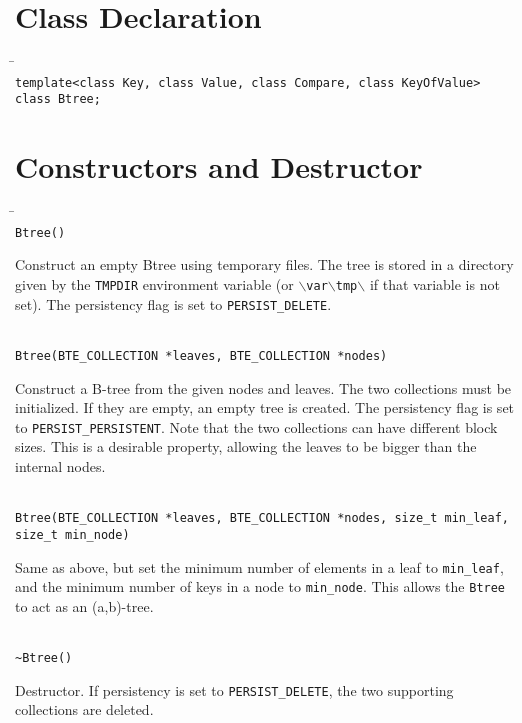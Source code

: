 \documentclass[11pt]{article}
\begin{document}
\section{Class Declaration}

   \begin{tabbing}
   \hspace*{.3in} \= \hspace{.5in} \= \\

   \> {\tt template<class Key, class Value, class Compare, class KeyOfValue> class Btree;}
   \end{tabbing}

\section{Constructors and Destructor}

   \begin{tabbing}
   \hspace*{.3in} \= \hspace{.5in} \= \\

   \> {\tt Btree()}\\ 
   \>\>\parbox[t]{5.5in}{Construct an empty Btree using temporary files. 
	The tree is stored in a directory given by the {\tt TMPDIR} 
	environment variable (or 
	{\tt $\backslash$var$\backslash$tmp$\backslash$} if that
	 variable is not set). The persistency flag is set to 
	{\tt PERSIST\_DELETE}.}\\[3mm]

   \> {\tt Btree(BTE\_COLLECTION *leaves, BTE\_COLLECTION *nodes)}\\ 
   \>\>\parbox[t]{5.5in}{Construct a B-tree from the given nodes and leaves.
	The two collections must be initialized. If they are empty, an
	empty tree is created. The persistency flag is set to 
	{\tt PERSIST\_PERSISTENT}. Note that the two collections can
	have different block sizes. This is a desirable property, 
	allowing the leaves to be bigger than the internal nodes.}\\[3mm]

   \> {\tt Btree(BTE\_COLLECTION *leaves, BTE\_COLLECTION *nodes, size\_t min\_leaf, size\_t min\_node)}\\ 
   \>\>\parbox[t]{5.5in}{Same as above, but set the minimum number of elements in a leaf to {\tt min\_leaf}, and the minimum number of keys in a node to {\tt min\_node}. This allows the {\tt Btree} to act as an (a,b)-tree. }\\[3mm]

   \> {\tt \verb|~|Btree()}\\ 
   \>\>\parbox[t]{5.5in}{Destructor. If persistency is set to 
	{\tt PERSIST\_DELETE}, the two supporting collections are deleted.}

   \end{tabbing}
\end{document}
